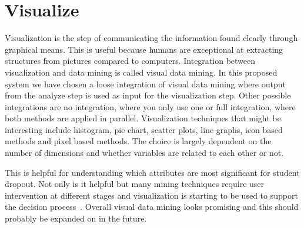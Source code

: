 \section{Visualize}	
Visualization is the step of communicating the information found clearly through graphical means. 
This is useful because humans are exceptional at extracting structures from pictures compared to computers. 
Integration between visualization and data mining is called visual data mining.
In this proposed system we have chosen a loose integration of visual data mining where output from the analyze step is used as input for the visualization step.
Other possible integrations are no integration, where you only use one or full integration, where both methods are applied in parallel.
Visualization techniques that might be interesting include histogram, pie chart, scatter plots, line graphs, icon based methods and pixel based methods.
The choice is largely dependent on the number of dimensions and whether variables are related to each other or not.

\bigskip\noindent
This is helpful for understanding which attributes are most significant for student dropout. 
Not only is it helpful but many mining techniques require user intervention at different stages and visualization is starting to be used to support the decision process~\cite{1207445}.
Overall visual data mining looks promising and this should probably be expanded on in the future.

